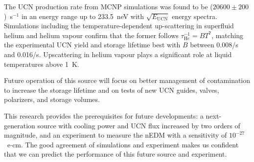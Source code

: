 The UCN production rate from MCNP simulations was found to be
($20600\pm 200$)~s$^{-1}$ in an energy range up to 233.5~neV with
$\sqrt{E_\mathrm{UCN}}$ energy spectra. Simulations including the
temperature-dependent up-scattering in superfluid helium and helium
vapour confirm that the former follows
$\tau_{\mathrm He} ^{-1} = B T^7$, matching the experimental UCN yield
and storage lifetime best with $B$ between 0.008/s and
0.016/s. Upscattering in helium vapour plays a significant role at
liquid temperatures above 1~K.

Future operation of this source will focus on better management of
contamination to increase the storage lifetime and on tests of new UCN
guides, valves, polarizers, and storage volumes.

This research provides the prerequisites for future developments: a
next-generation source with cooling power and UCN flux increased by
two orders of magnitude, and an experiment to measure the nEDM with a
sensitivity of $10^{-27}$~e$\cdot$cm. The good agreement of
simulations and experiment makes us confident that we can predict the
performance of this future source and experiment.









  
  
  
